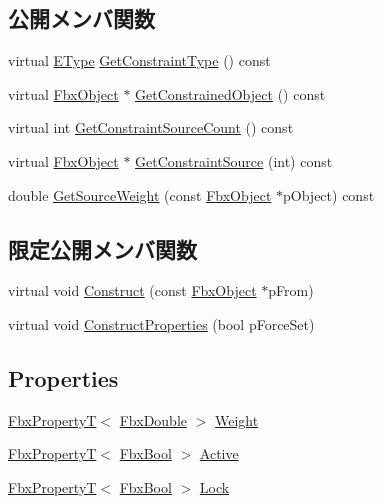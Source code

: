 \subsection*{公開メンバ関数}
\begin{DoxyCompactItemize}
\item 
virtual \hyperlink{class_fbx_constraint_a49c1634663395eab7c28856df233ec66}{E\+Type} \hyperlink{class_fbx_constraint_adbeea66a1a605531a019aa6df90dc45b}{Get\+Constraint\+Type} () const
\item 
virtual \hyperlink{class_fbx_object}{Fbx\+Object} $\ast$ \hyperlink{class_fbx_constraint_a7f587d5db9685b5ee925a85354263edc}{Get\+Constrained\+Object} () const
\item 
virtual int \hyperlink{class_fbx_constraint_aa702f86c6a1832ce3b4905911e66c58f}{Get\+Constraint\+Source\+Count} () const
\item 
virtual \hyperlink{class_fbx_object}{Fbx\+Object} $\ast$ \hyperlink{class_fbx_constraint_a5ff6fe6fc98af1e33e8b297bc1cea007}{Get\+Constraint\+Source} (int) const
\item 
double \hyperlink{class_fbx_constraint_a4466dd54c32b822252c5e960d0be1836}{Get\+Source\+Weight} (const \hyperlink{class_fbx_object}{Fbx\+Object} $\ast$p\+Object) const
\end{DoxyCompactItemize}
\subsection*{限定公開メンバ関数}
\begin{DoxyCompactItemize}
\item 
virtual void \hyperlink{class_fbx_constraint_a6350b98fa8717caf9167c5513824310c}{Construct} (const \hyperlink{class_fbx_object}{Fbx\+Object} $\ast$p\+From)
\item 
virtual void \hyperlink{class_fbx_constraint_a0470a25b813b337d07a03ce4b97b44f8}{Construct\+Properties} (bool p\+Force\+Set)
\end{DoxyCompactItemize}
\subsection*{Properties}
\begin{DoxyCompactItemize}
\item 
\hyperlink{class_fbx_property_t}{Fbx\+PropertyT}$<$ \hyperlink{fbxtypes_8h_a171e72a1c46fc15c1a6c9c31948c1c5b}{Fbx\+Double} $>$ \hyperlink{class_fbx_constraint_ad056a05f11bcd1df8aae65fa6ab941d6}{Weight}
\item 
\hyperlink{class_fbx_property_t}{Fbx\+PropertyT}$<$ \hyperlink{fbxtypes_8h_a92e0562b2fe33e76a242f498b362262e}{Fbx\+Bool} $>$ \hyperlink{class_fbx_constraint_ab34f884cb053f5bb9c18f65582ab84e1}{Active}
\item 
\hyperlink{class_fbx_property_t}{Fbx\+PropertyT}$<$ \hyperlink{fbxtypes_8h_a92e0562b2fe33e76a242f498b362262e}{Fbx\+Bool} $>$ \hyperlink{class_fbx_constraint_a591ebe51dd090af37644355200b70d9a}{Lock}
\end{DoxyCompactItemize}

